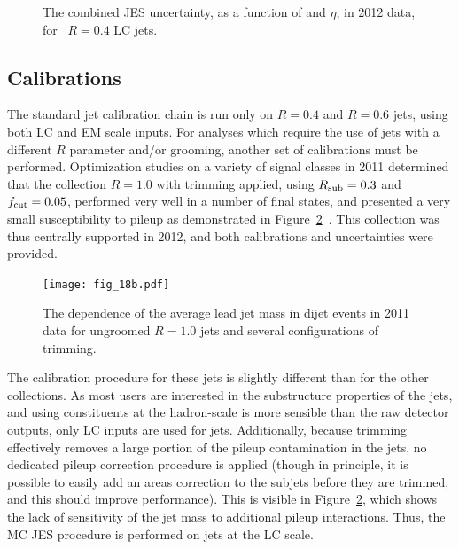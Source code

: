 
\begin{figure}
\centering
{}
\label{fig:jet-reconstruction:combined_uncertainties}
\caption{The combined JES uncertainty, as a function of \pt and $\eta$, in 2012 data, for \antikt~$R=0.4$ LC jets.}
\end{figure}



\subsection{\LargeR Calibrations}
\label{chapter:jet-reconstruction:larger}
The standard jet calibration chain is run only on $R=0.4$ and $R=0.6$ jets, using both LC and EM scale inputs. For analyses which require the use of jets with a different $R$ parameter and/or grooming, another set of calibrations must be performed. Optimization studies on a variety of signal classes in 2011 determined that the collection \antikt $R=1.0$ with trimming applied, using $R_{\rm sub} = 0.3$ and $f_{\rm cut} = 0.05$, performed very well in a number of final states, and presented a very small susceptibility to pileup as demonstrated in Figure~\ref{fig:jet-reconstruction:pileup_large}~\cite{ATLAS-SS-2011}. This collection was thus centrally supported in 2012, and both calibrations and uncertainties were provided.

\begin{figure}
\centering
\texttt{[image: fig\_18b.pdf]}
\label{fig:jet-reconstruction:pileup_large}
\caption{The dependence of the average lead jet mass in dijet events in 2011 data for ungroomed \antikt $R=1.0$ jets and several configurations of trimming.}
\end{figure}


The calibration procedure for these \largeR jets is slightly different than for the other collections. As most users are interested in the substructure properties of the jets, and using constituents at the hadron-scale is more sensible than the raw detector outputs, only LC inputs are used for \largeR jets. Additionally, because trimming effectively removes a large portion of the pileup contamination in the jets, no dedicated pileup correction procedure is applied (though in principle, it is possible to easily add an areas correction to the subjets before they are trimmed, and this should improve performance). This is visible in Figure~\ref{fig:jet-reconstruction:pileup_large}, which shows the lack of sensitivity of the jet mass to additional pileup interactions. Thus, the MC JES procedure is performed on jets at the LC scale.

